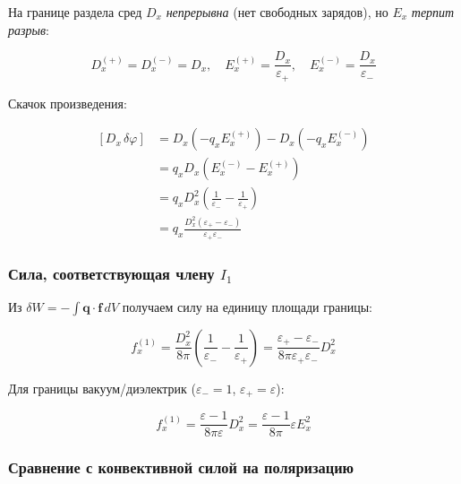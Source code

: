 \documentclass[a4paper,12pt]{article}
\begin{document}
На границе раздела сред $D_x$ \textit{непрерывна} (нет свободных зарядов),
но $E_x$ \textit{терпит разрыв}:

\begin{equation}
D_x^{(+)} = D_x^{(-)} = D_x, \quad
E_x^{(+)} = \frac{D_x}{\varepsilon_+}, \quad
E_x^{(-)} = \frac{D_x}{\varepsilon_-}
\label{eq:boundary_conditions_D_E}
\end{equation}

Скачок произведения:

\begin{equation}
\begin{aligned}
[D_x\,\delta\varphi] &= D_x(-q_x E_x^{(+)}) - D_x(-q_x E_x^{(-)}) \\
&= q_x D_x (E_x^{(-)} - E_x^{(+)}) \\
&= q_x D_x^2 \left(\frac{1}{\varepsilon_-} - \frac{1}{\varepsilon_+}\right) \\
&= q_x \frac{D_x^2(\varepsilon_+ - \varepsilon_-)}{\varepsilon_+\varepsilon_-}
\end{aligned}
\label{eq:jump_D_delta_phi}
\end{equation}

\subsubsection{Сила, соответствующая члену $I_1$}

Из $\delta W = -\int\mathbf{q}\cdot\mathbf{f}\,dV$ получаем силу на единицу
площади границы:

\begin{equation}
\boxed{
f_x^{(1)} = \frac{D_x^2}{8\pi}\left(\frac{1}{\varepsilon_-} - \frac{1}{\varepsilon_+}\right)
= \frac{\varepsilon_+ - \varepsilon_-}{8\pi\varepsilon_+\varepsilon_-}D_x^2
}
\label{eq:force_term_1}
\end{equation}

Для границы вакуум/диэлектрик ($\varepsilon_- = 1$, $\varepsilon_+ = \varepsilon$):

\begin{equation}
f_x^{(1)} = \frac{\varepsilon - 1}{8\pi\varepsilon}D_x^2 =
\frac{\varepsilon - 1}{8\pi}\varepsilon E_x^2
\label{eq:force_term_1_vacuum_dielectric}
\end{equation}

\subsubsection{Сравнение с конвективной силой на поляризацию}
\end{document}
